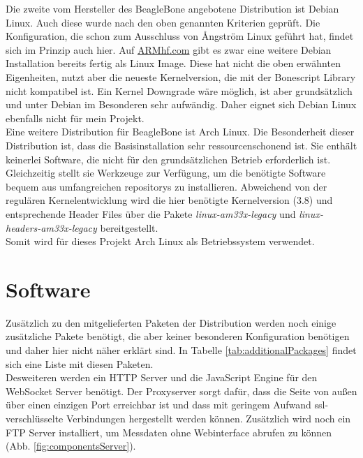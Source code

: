 \documentclass[thesis.tex]{subfiles}
\begin{document}
Die zweite vom Hersteller des BeagleBone angebotene Distribution ist Debian Linux. Auch diese wurde nach den oben genannten Kriterien geprüft. Die Konfiguration, die schon zum Ausschluss von {\AA}ngström Linux geführt hat, findet sich im Prinzip auch hier. Auf \href{http://www.armhf.com/}{ARMhf.com} gibt es zwar eine weitere Debian Installation bereits fertig als Linux Image. Diese hat nicht die oben erwähnten Eigenheiten, nutzt aber die neueste Kernelversion, die mit der Bonescript Library nicht kompatibel ist. Ein Kernel Downgrade wäre möglich, ist aber grundsätzlich und unter Debian im Besonderen sehr aufwändig. Daher eignet sich Debian Linux ebenfalls nicht für mein Projekt.\\

Eine weitere Distribution für BeagleBone ist Arch Linux. Die Besonderheit dieser Distribution ist, dass die Basisinstallation sehr ressourcenschonend ist. Sie enthält keinerlei Software, die nicht für den grundsätzlichen Betrieb erforderlich ist. Gleichzeitig stellt sie Werkzeuge zur Verfügung, um die benötigte Software bequem aus umfangreichen \glspl{repository} zu installieren. Abweichend von der regulären Kernelentwicklung wird die hier benötigte Kernelversion (3.8) und entsprechende Header Files über die Pakete \textit{linux-am33x-legacy} und \textit{linux-headers-am33x-legacy} bereitgestellt.\\

Somit wird für dieses Projekt Arch Linux als Betriebssystem verwendet.


\section{Software}

Zusätzlich zu den mitgelieferten Paketen der Distribution werden noch einige zusätzliche Pakete benötigt, die aber keiner besonderen Konfiguration benötigen und daher hier nicht näher erklärt sind. In Tabelle \ref{tab:additionalPackages} findet sich eine Liste mit diesen Paketen.\\

Desweiteren werden ein HTTP Server und die JavaScript Engine für den WebSocket Server benötigt. Der Proxyserver sorgt dafür, dass die Seite von außen über einen einzigen Port erreichbar ist und dass mit geringem Aufwand \gls{ssl}-verschlüsselte Verbindungen hergestellt werden können. Zusätzlich wird noch ein FTP Server installiert, um Messdaten ohne Webinterface abrufen zu können (Abb. \ref{fig:componentsServer}).
\end{document}
